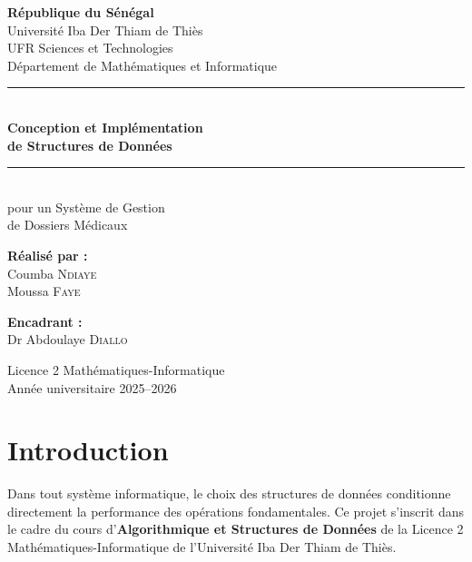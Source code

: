 \documentclass[12pt, a4paper]{article}
\begin{document}
\begin{titlepage}
    \pagecolor{bleuUIDT}
    \color{white}
    \centering
    \vspace*{1.5cm}
    {\large\bfseries République du Sénégal}\\[0.3cm]
    {\large Université Iba Der Thiam de Thiès}\\[0.3cm]
    {\large UFR Sciences et Technologies}\\[0.2cm]
    {\large Département de Mathématiques et Informatique}\\[2cm]
    \noindent\rule{\textwidth}{0.5pt}\\[0.5cm]
    {\Huge\bfseries Conception et Implémentation\\[0.3cm]
    de Structures de Données}\\[0.3cm]
    \noindent\rule{\textwidth}{0.5pt}\\[0.5cm]
    {\Large pour un Système de Gestion\\[0.2cm]
    de Dossiers Médicaux}\\[2.5cm]
    \begin{minipage}{0.45\textwidth}
        \centering
        {\large\bfseries Réalisé par :}\\[0.3cm]
        {\Large Coumba \textsc{Ndiaye}}\\[0.2cm]
        {\Large Moussa \textsc{Faye}}
    \end{minipage}
    \hfill
    \begin{minipage}{0.45\textwidth}
        \centering
        {\large\bfseries Encadrant :}\\[0.3cm]
        {\Large Dr Abdoulaye \textsc{Diallo}}
    \end{minipage}
    \vfill
    {\large Licence 2 Mathématiques-Informatique}\\[0.3cm]
    {\large Année universitaire 2025--2026}
\end{titlepage}
\pagecolor{white}
\color{black}

\newpage
\tableofcontents
\newpage

\section{Introduction}

Dans tout système informatique, le choix des structures de données 
conditionne directement la performance des opérations fondamentales. 
Ce projet s'inscrit dans le cadre du cours d'\textbf{Algorithmique 
et Structures de Données} de la Licence 2 Mathématiques-Informatique 
de l'Université Iba Der Thiam de Thiès.
\end{document}
